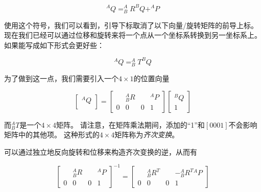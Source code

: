 \begin{equation}
^AQ=^A_BR^BQ+^AP
\end{equation}

使用这个符号，我们可以看到，引导下标取消了以下向量/旋转矩阵的前导上标。现在我们已经可以通过位移和旋转来将一个点从一个坐标系转换到另一坐标系上。如果能写成如下形式会更好些：

\begin{equation}
^AQ=^A_BT^BQ
\end{equation}

为了做到这一点，我们需要引入一个$4\times1$的位置向量

\begin{equation}
\left[\begin{array}{c}^AQ\\\end{array}\right]=\left[\begin{array}{ccc|c} & ^A_BR & & ^AP \\\hline 0 & 0 & 0 & 1\end{array}\right]\left[\begin{array}{c}^BQ\\1\end{array}\right]
\end{equation}

而$ ^A_BT$是一个$4\times 4$矩阵。 请注意，在矩阵乘法期间，添加的“1”和$ [0 0 0 1] $不会影响矩阵中的其他项。 这种形式的$4\times 4$矩阵称为\emph{齐次变换}。


可以通过独立地反向旋转和位移来构造齐次变换的逆，从而有

\begin{equation}
\left[\begin{array}{ccc|c} & ^A_BR & & ^AP \\\hline 0 & 0 & 0 & 1\end{array}\right]^{-1}=
\left[\begin{array}{ccc|c} & ^A_BR^T & & -^A_B{R^T}{^AP} \\\hline 0 & 0 & 0 & 1\end{array}\right]
\end{equation}

